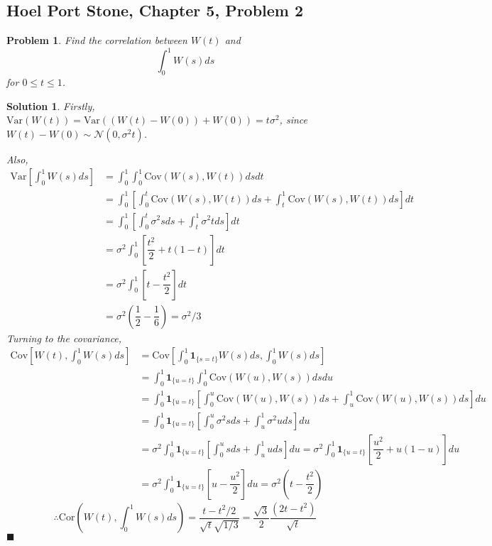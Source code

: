 \documentclass[12pt]{article}
\theoremstyle{problemstyle}
\newtheorem{pbm}{Problem}
\newtheorem*{solution*}{Solution}
\newenvironment{problem}{
\begin{tcolorbox}[colback=green!10!white,colframe=black!75!black, parbox = false]\begin{pbm} }{\end{pbm}\end{tcolorbox} }
\newcommand{\Var}{\text{Var}}
\newcommand{\Cov}{\text{Cov}}
\newcommand{\normal}{\mathcal{N}}
\newcommand{\ind}[1]{\boldsymbol{1}_{\{ #1 \}}}
\begin{document}
\subsection{Hoel Port Stone, Chapter 5, Problem 2}
\begin{problem}
Find the correlation between $W(t)$ and 
$$\int_0^1 W(s) ds$$ 
\noindent for $0 \leq t \leq 1$.
\end{problem}
\begin{solution*}

Firstly, $\Var(W(t)) = \Var((W(t) - W(0)) + W(0)) = t \sigma^2$, since $W(t) - W(0) \sim \normal(0, \sigma^2 t)$.

Also, 
\begin{align*}
    \Var\left[ \int_0^1 W(s) ds \right]
    & = \int_0^1 \int_0^1 \Cov(W(s), W(t)) ds dt\\
    & = \int_0^1 \left[ \int_0^t \Cov(W(s), W(t)) ds + \int_t^1 \Cov(W(s), W(t)) ds \right] dt  \\
    & = \int_0^1 \left[ \int_0^t \sigma^2 s ds + \int_t^1 \sigma^2 t  ds \right] dt\\
    & = \sigma^2 \int_0^1 \left[ \dfrac{t^2}{2} + t(1-t) \right]dt\\
    & = \sigma^2 \int_0^1 \left[ t - \dfrac{t^2}{2} \right]dt\\
    & = \sigma^2 \left( \dfrac{1}{2} - \dfrac{1}{6} \right) = \sigma^2/3
\end{align*}
Turning to the covariance,
\allowdisplaybreaks
\begin{align*}
    \Cov\left[ W(t), \int_0^1 W(s) ds \right]
    & = \Cov\left[ \int_0^1 \ind{s = t}W(s)ds, \int_0^1 W(s) ds \right]\\
    &= \int_0^1 \ind{u = t} \int_0^1 \Cov(W(u), W(s)) ds du\\
    & = \int_0^1 \ind{u = t} \left[ \int_0^u \Cov(W(u), W(s)) ds + \int_u^1 \Cov(W(u), W(s))ds \right] du\\
    & = \int_0^1 \ind{u = t} \left[ \int_0^u \sigma^2 s ds + \int_u^1 \sigma^2 u ds \right] du\\
    & = \sigma^2 \int_0^1 \ind{u = t} \left[ \int_0^u s ds + \int_u^1 u ds \right]du
     = \sigma^2 \int_0^1 \ind{u = t} \left[ \dfrac{u^2}{2} + u(1-u) \right]du\\
    & = \sigma^2 \int_0^1 \ind{u = t} \left[ u - \dfrac{u^2}{2} \right] du
    = \sigma^2 \left( t - \dfrac{t^2}{2} \right)
\end{align*}
$$
\boxed{\therefore \text{Cor}\left( W(t), \int_0^1 W(s)ds \right) = \dfrac{t - t^2/2}{\sqrt{t} \sqrt{1/3}} = \dfrac{\sqrt{3}}{2} \dfrac{(2t - t^2)}{\sqrt{t}}}
$$ 
\hfill $\blacksquare$
\end{solution*}
\end{document}
